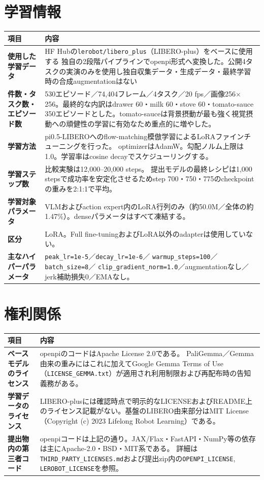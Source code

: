 \documentclass[10pt,a4paper]{article}
\newcommand{\code}[1]{\texttt{\small #1}}
\newcommand{\reportrow}[2]{\textbf{#1} & #2 \\}
\newcommand{\tablehead}{\rowcolor{blue!12}\textbf{項目} & \textbf{内容} \\}
\begin{document}
\section{学習情報}
\begin{tabularx}{\textwidth}{@{}LY@{}}
\toprule
\tablehead
\midrule
\reportrow{使用した学習データ}{
  HF Hubの\code{lerobot/libero\_plus}（LIBERO-plus）をベースに使用する
  独自の2段階パイプラインでopenpi形式へ変換した。公開4タスクの実演のみを使用し独自収集データ・生成データ・最終学習時の合成augmentationはない}
\reportrow{件数・タスク数・エピソード数}{
  530エピソード／74,404フレーム／4タスク／20 fps／画像256$\times$256。最終的な内訳はdrawer 60・milk 60・stove 60・tomato-sauce 350エピソードとした。tomato-sauceは背景摂動が最も強く視覚摂動への頑健性の学習に有効なため重点的に増やした。}
\reportrow{学習方法}{
  pi0.5-LIBEROへのflow-matching模倣学習によるLoRAファインチューニングを行った。
  optimizerはAdamW。勾配ノルム上限は1.0。学習率はcosine decayでスケジューリングする。}
\reportrow{学習ステップ数}{
  比較実験は12,000--20,000 steps。
  提出モデルの最終レシピは1,000 stepsで成功率を安定化させるためstep 700・750・775のcheckpointの重みを2:1:1で平均。}
\reportrow{学習対象パラメータ}{
  VLMおよびaction expert内のLoRA行列のみ（約50.0M／全体の約1.47\%）。denseパラメータはすべて凍結する。}
\reportrow{区分}{
  LoRA。Full fine-tuningおよびLoRA以外のadapterは使用していない。}
\reportrow{主なハイパーパラメータ}{
  \code{peak\_lr=1e-5}／\code{decay\_lr=1e-6}／
  \code{warmup\_steps=100}／\code{batch\_size=8}／
  \code{clip\_gradient\_norm=1.0}／augmentationなし／jerk補助損失0／EMAなし。}
\bottomrule
\end{tabularx}

\section{権利関係}

\begin{tabularx}{\textwidth}{@{}LY@{}}
\toprule
\tablehead
\midrule
\reportrow{ベースモデルのライセンス}{
  openpiのコードはApache License 2.0である。
  PaliGemma／Gemma由来の重みにはこれに加えてGoogle Gemma Terms of Use（\code{LICENSE\_GEMMA.txt}）が適用され利用制限および再配布時の告知義務がある。}
\reportrow{学習データのライセンス}{
  LIBERO-plusには確認時点で明示的なLICENSEおよびREADME上のライセンス記載がない。基盤のLIBERO由来部分はMIT License（Copyright (c) 2023 Lifelong Robot Learning）である。}
\reportrow{提出物内の第三者コード}{
  openpiコードは上記の通り。JAX/Flax・FastAPI・NumPy等の依存は主にApache-2.0・BSD・MIT系である。
  詳細は\code{THIRD\_PARTY\_LICENSES.md}および提出zip内の\code{OPENPI\_LICENSE}, \code{LEROBOT\_LICENSE}を参照。}
\bottomrule
\end{tabularx}
\end{document}
